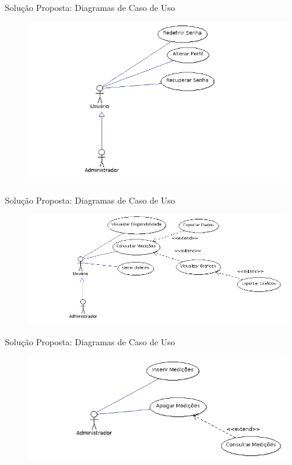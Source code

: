 \begin{frame}{Solução Proposta: Diagramas de Caso de Uso}
\begin{figure}[h!]
\centering
\includegraphics[width=0.7\linewidth]{./img/uc002}
\end{figure}
\end{frame}

\begin{frame}{Solução Proposta: Diagramas de Caso de Uso}
\begin{figure}[h!]
\centering
\includegraphics[width=1\linewidth]{./img/uc003}
\end{figure}
\end{frame}

\begin{frame}{Solução Proposta: Diagramas de Caso de Uso}
\begin{figure}[h!]
\centering
\includegraphics[width=1\linewidth]{./img/uc004}
\end{figure}
\end{frame}


